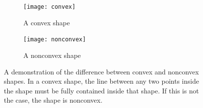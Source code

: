 \begin{figure}[]
    \centering
    
    \begin{subfigure}[]{0.35\textwidth}
        \texttt{[image: convex]}
        \caption{A convex shape}
        \label{fig:convex-example}
    \end{subfigure}
    \hfil
    \begin{subfigure}[]{0.35\textwidth}
        \texttt{[image: nonconvex]}
        \caption{A nonconvex shape}
        \label{fig:nonconvex-example}
    \end{subfigure}
    \caption[A demonstration of the difference between a convex and nonconvex shape]{A demonstration of the difference between convex and nonconvex shapes. In a convex shape, the line between any two points inside the shape must be fully contained inside that shape. If this is not the case, the shape is nonconvex.}\label{fig:convexity-example}
\end{figure}


